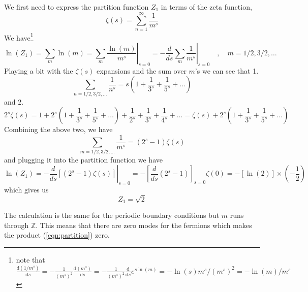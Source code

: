 \documentclass[12pt,a4paper]{article}
\begin{document}
We first need to express the partition function $ Z_1 $ in terms of the zeta function,
\begin{equation}
	\zeta (s) = \sum_{n = 1}^{\infty} \frac{ 1 }{ m^s } 
\end{equation}
We have\footnote{note that $ \frac{\mathrm{d} (1/m^s)}{\mathrm{d} s} = - \frac{  1}{(m^s)^2  } \frac{\mathrm{d} (m^s)}{\mathrm{d} s}   = - \frac{  1}{(m^s)^2  } \frac{\mathrm{d} }{\mathrm{d} s} e ^{ s \ln(m) } = -\ln(s) m^s/(m^s)^2= -\ln(m)/m^s $}
\begin{equation*}
	\ln \left(Z_1\right)=\sum_m \ln (m)=\left.\sum_m \frac{\ln (m)}{m^{s}}\right|_{s=0}=-\left.\frac{d}{d s} \sum_m \frac{1}{m^{s}}\right|_{s=0}\quad ,\quad m=1/2,3/2, \dots
\end{equation*}
Playing a bit with the $ \zeta(s) $ expansions and the sum over $ m $'s we can see that 1.
\begin{equation*}
	\sum_{n=1/2,3/2,\dots}^{} \frac{ 1 }{ n^s } = s \left( 1 + \frac{ 1 }{ 3^s } + \frac{ 1 }{ 5^s } + \dots  \right) 
\end{equation*}
and 2.
\begin{equation*}
	2^s\zeta(s) = 1 + 2^s \left( 1 + \frac{ 1 }{ 3^s} + \frac{ 1 }{ 5^s } + \dots  \right) + \frac{ 1 }{ 2^s } + \frac{ 1 }{ 3^s } + \frac{ 1 }{ 4^s } + \dots = \zeta(s) + 2^s \left( 1 + \frac{ 1 }{ 3^s} + \frac{ 1 }{ 5^s } + \dots  \right)
\end{equation*}
Combining the above two, we have
\begin{equation*}
	\sum_{m=1/2,3/2,\dots}^{} \frac{ 1 }{ m^s } = \left( 2^s -1 \right) \zeta(s)
\end{equation*}
and plugging it into the partition function we have
\begin{equation*}
	\ln \left(Z_1\right)=-\left.\frac{d}{d s}\left[\left(2^{s}-1\right) \zeta(s)\right]\right|_{s=0}=-\left[\frac{d}{d s}\left(2^{s}-1\right)\right]_{s=0} \zeta(0)=-[\ln (2)] \times\left(-\frac{1}{2}\right)
\end{equation*}
which gives us
\begin{equation*}
	Z_1 = \sqrt{ 2 } 
\end{equation*}

The calculation is the same for the periodic boundary conditions but $ m $ runs through $ \mathbb{ Z }  $. This means that there are zero modes for the fermions which makes the product  (\ref{eqn:partition}) zero.
\end{document}
